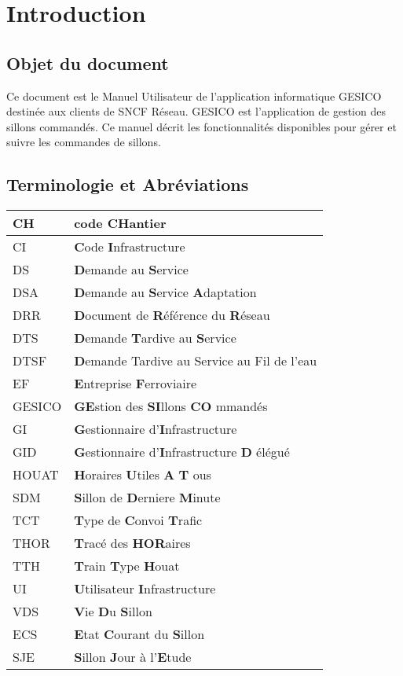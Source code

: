 \documentclass[a4paper]{report}
\begin{document}
\chapter{Introduction}
\section{Objet du document}

Ce document est le Manuel Utilisateur de l’application informatique GESICO destinée aux clients de SNCF Réseau. GESICO est l’application de gestion des sillons commandés. Ce manuel décrit les fonctionnalités disponibles pour gérer et suivre les commandes de sillons.

\section{Terminologie et Abréviations}	
\begin{table}[h]
	\begin{tabular}{|l|l|}
		\hline
		CH & code \textbf{CH}antier \\
		\hline
		CI & \textbf{C}ode \textbf{I}nfrastructure \\
		\hline
		DS & \textbf{D}emande au \textbf{S}ervice \\
		\hline
		DSA & \textbf{D}emande au \textbf{S}ervice \textbf{A}daptation 
		\\
		\hline
		DRR & \textbf{D}ocument\textbf{ }de\textbf{ R}éférence du 
		\textbf{R}éseau \\
		\hline
		DTS & \textbf{D}emande \textbf{T}ardive au \textbf{S}ervice \\
		\hline
		DTSF & \textbf{D}emande Tardive au Service au Fil de l'eau \\
		\hline
		EF & \textbf{E}ntreprise \textbf{F}erroviaire \\
		\hline
		GESICO & \textbf{GE}stion des \textbf{SI}llons \textbf{CO}
		mmandés \\
		\hline
		GI & \textbf{G}estionnaire d'\textbf{I}nfrastructure \\
		\hline
		GID & \textbf{G}estionnaire d'\textbf{I}nfrastructure \textbf{D
		}élégué \\
		\hline
		HOUAT & \textbf{H}oraires \textbf{U}tiles \textbf{A} \textbf{T
		}ous \\
		\hline
		SDM & \textbf{S}illon de \textbf{D}erniere \textbf{M}inute \\
		\hline
		TCT & \textbf{T}ype de \textbf{C}onvoi \textbf{T}rafic \\
		\hline
		THOR & \textbf{T}racé des \textbf{HOR}aires \\
		\hline
		TTH & \textbf{T}rain \textbf{T}ype \textbf{H}ouat \\
		\hline
		UI & \textbf{U}tilisateur \textbf{I}nfrastructure \\
		\hline
		VDS & \textbf{V}ie \textbf{D}u \textbf{S}illon \\
		\hline
		ECS & \textbf{E}tat \textbf{C}ourant du \textbf{S}illon \\
		\hline
		SJE & \textbf{S}illon \textbf{J}our à l'\textbf{E}tude \\
		\hline
	\end{tabular}
\end{table}
\end{document}
